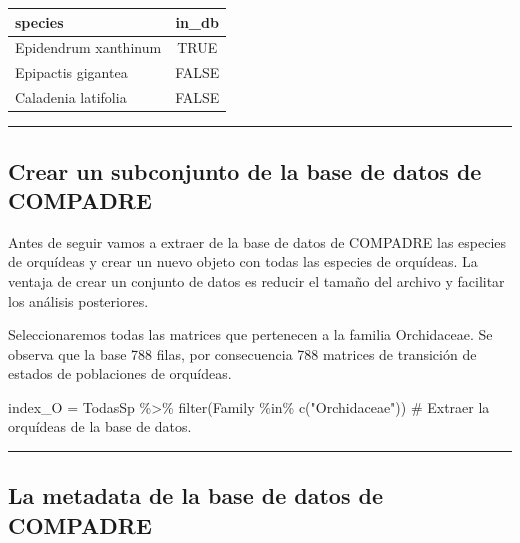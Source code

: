 \documentclass[
  12pt,
  letterpaper,
]{book}
\newenvironment{Shaded}{\begin{snugshade}}{\end{snugshade}}
\newcommand{\CommentTok}[1]{\textcolor[rgb]{0.37,0.37,0.37}{#1}}
\newcommand{\FunctionTok}[1]{\textcolor[rgb]{0.28,0.35,0.67}{#1}}
\newcommand{\NormalTok}[1]{\textcolor[rgb]{0.00,0.23,0.31}{#1}}
\newcommand{\OtherTok}[1]{\textcolor[rgb]{0.00,0.23,0.31}{#1}}
\newcommand{\SpecialCharTok}[1]{\textcolor[rgb]{0.37,0.37,0.37}{#1}}
\newcommand{\StringTok}[1]{\textcolor[rgb]{0.13,0.47,0.30}{#1}}
\begin{document}
\begin{table}
\fontsize{12.0pt}{14.0pt}\selectfont
\begin{tabular*}{\linewidth}{@{\extracolsep{\fill}}lc}
\toprule
species & in\_db \\ 
\midrule\addlinespace[2.5pt]
Epidendrum xanthinum & TRUE \\ 
Epipactis gigantea & FALSE \\ 
Caladenia latifolia & FALSE \\ 
\bottomrule
\end{tabular*}
\end{table}

\begin{center}\rule{0.5\linewidth}{0.5pt}\end{center}

\subsection{Crear un subconjunto de la base de datos de
COMPADRE}\label{crear-un-subconjunto-de-la-base-de-datos-de-compadre}

Antes de seguir vamos a extraer de la base de datos de COMPADRE las
especies de orquídeas y crear un nuevo objeto con todas las especies de
orquídeas. La ventaja de crear un conjunto de datos es reducir el tamaño
del archivo y facilitar los análisis posteriores.

Seleccionaremos todas las matrices que pertenecen a la familia
Orchidaceae. Se observa que la base 788 filas, por consecuencia 788
matrices de transición de estados de poblaciones de orquídeas.

\begin{Shaded}
\begin{Highlighting}[]
\NormalTok{index\_O }\OtherTok{=}\NormalTok{ TodasSp }\SpecialCharTok{\%\textgreater{}\%}
  \FunctionTok{filter}\NormalTok{(Family }\SpecialCharTok{\%in\%} \FunctionTok{c}\NormalTok{(}\StringTok{"Orchidaceae"}\NormalTok{)) }\CommentTok{\# Extraer la orquídeas de la base de datos.}
\end{Highlighting}
\end{Shaded}

\begin{center}\rule{0.5\linewidth}{0.5pt}\end{center}

\subsection{La metadata de la base de datos de
COMPADRE}\label{la-metadata-de-la-base-de-datos-de-compadre}
\end{document}
